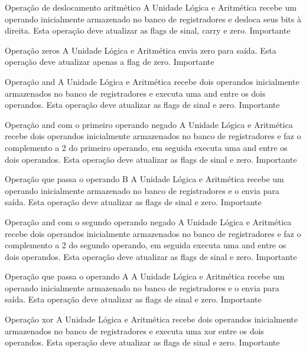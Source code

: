\documentclass{report}
\begin{document}
\begin{functional}
       \requirement
      {Operação de deslocamento aritmético}
      {A Unidade Lógica e Aritmética recebe um operando inicialmente armazenado no banco de registradores e desloca seus bits à direita. Esta operação deve atualizar as flags de sinal, carry e zero.}
      {Importante}
      
       \requirement
      {Operação zeros}
      {A Unidade Lógica e Aritmética envia zero para saída. Esta operação deve atualizar apenas a flag de zero.}
      {Importante}
      
      \requirement
      {Operação and}
      {A Unidade Lógica e Aritmética recebe dois operandos inicialmente armazenados no banco de registradores e executa uma and entre os dois operandos. Esta operação deve atualizar as flags de sinal e zero.}
      {Importante}
      
      \requirement
      {Operação and com o primeiro operando negado}
      {A Unidade Lógica e Aritmética recebe dois operandos inicialmente armazenados no banco de registradores e faz o complemento a 2 do primeiro operando, em seguida executa uma and entre os dois operandos. Esta operação deve atualizar as flags de sinal e zero.}
      {Importante}
      
      \requirement
      {Operação que passa o operando B}
      {A Unidade Lógica e Aritmética recebe um operando inicialmente armazenado no banco de registradores e o envia para saída. Esta operação deve atualizar as flags de sinal e zero.}
      {Importante}
      
      \requirement
      {Operação and com o segundo operando negado}
      {A Unidade Lógica e Aritmética recebe dois operandos inicialmente armazenados no banco de registradores e faz o complemento a 2 do segundo operando, em seguida executa uma and entre os dois operandos. Esta operação deve atualizar as flags de sinal e zero.}
      {Importante}
      
      \requirement
      {Operação que passa o operando A}
      {A Unidade Lógica e Aritmética recebe um operando inicialmente armazenado no banco de registradores e o envia para saída. Esta operação deve atualizar as flags de sinal e zero.}
      {Importante}
      
      \requirement
      {Operação xor}
      {A Unidade Lógica e Aritmética recebe dois operandos inicialmente armazenados no banco de registradores e executa uma xor entre os dois operandos. Esta operação deve atualizar as flags de sinal e zero.}
      {Importante}
      

\end{functional}
\end{document}
